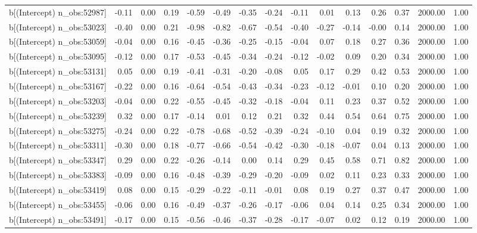 \begin{table}[ht]
\begin{tabular}{rrrrrrrrrrrrrrr}
  b[(Intercept) n\_obs:52987] & -0.11 & 0.00 & 0.19 & -0.59 & -0.49 & -0.35 & -0.24 & -0.11 & 0.01 & 0.13 & 0.26 & 0.37 & 2000.00 & 1.00 \\ 
  b[(Intercept) n\_obs:53023] & -0.40 & 0.00 & 0.21 & -0.98 & -0.82 & -0.67 & -0.54 & -0.40 & -0.27 & -0.14 & -0.00 & 0.14 & 2000.00 & 1.00 \\ 
  b[(Intercept) n\_obs:53059] & -0.04 & 0.00 & 0.16 & -0.45 & -0.36 & -0.25 & -0.15 & -0.04 & 0.07 & 0.18 & 0.27 & 0.36 & 2000.00 & 1.00 \\ 
  b[(Intercept) n\_obs:53095] & -0.12 & 0.00 & 0.17 & -0.53 & -0.45 & -0.34 & -0.24 & -0.12 & -0.02 & 0.09 & 0.20 & 0.34 & 2000.00 & 1.00 \\ 
  b[(Intercept) n\_obs:53131] & 0.05 & 0.00 & 0.19 & -0.41 & -0.31 & -0.20 & -0.08 & 0.05 & 0.17 & 0.29 & 0.42 & 0.53 & 2000.00 & 1.00 \\ 
  b[(Intercept) n\_obs:53167] & -0.22 & 0.00 & 0.16 & -0.64 & -0.54 & -0.43 & -0.34 & -0.23 & -0.12 & -0.01 & 0.10 & 0.20 & 2000.00 & 1.00 \\ 
  b[(Intercept) n\_obs:53203] & -0.04 & 0.00 & 0.22 & -0.55 & -0.45 & -0.32 & -0.18 & -0.04 & 0.11 & 0.23 & 0.37 & 0.52 & 2000.00 & 1.00 \\ 
  b[(Intercept) n\_obs:53239] & 0.32 & 0.00 & 0.17 & -0.14 & 0.01 & 0.12 & 0.21 & 0.32 & 0.44 & 0.54 & 0.64 & 0.75 & 2000.00 & 1.00 \\ 
  b[(Intercept) n\_obs:53275] & -0.24 & 0.00 & 0.22 & -0.78 & -0.68 & -0.52 & -0.39 & -0.24 & -0.10 & 0.04 & 0.19 & 0.32 & 2000.00 & 1.00 \\ 
  b[(Intercept) n\_obs:53311] & -0.30 & 0.00 & 0.18 & -0.77 & -0.66 & -0.54 & -0.42 & -0.30 & -0.18 & -0.07 & 0.04 & 0.13 & 2000.00 & 1.00 \\ 
  b[(Intercept) n\_obs:53347] & 0.29 & 0.00 & 0.22 & -0.26 & -0.14 & 0.00 & 0.14 & 0.29 & 0.45 & 0.58 & 0.71 & 0.82 & 2000.00 & 1.00 \\ 
  b[(Intercept) n\_obs:53383] & -0.09 & 0.00 & 0.16 & -0.48 & -0.39 & -0.29 & -0.20 & -0.09 & 0.02 & 0.11 & 0.23 & 0.33 & 2000.00 & 1.00 \\ 
  b[(Intercept) n\_obs:53419] & 0.08 & 0.00 & 0.15 & -0.29 & -0.22 & -0.11 & -0.01 & 0.08 & 0.19 & 0.27 & 0.37 & 0.47 & 2000.00 & 1.00 \\ 
  b[(Intercept) n\_obs:53455] & -0.06 & 0.00 & 0.16 & -0.49 & -0.37 & -0.26 & -0.17 & -0.06 & 0.04 & 0.14 & 0.25 & 0.34 & 2000.00 & 1.00 \\ 
  b[(Intercept) n\_obs:53491] & -0.17 & 0.00 & 0.15 & -0.56 & -0.46 & -0.37 & -0.28 & -0.17 & -0.07 & 0.02 & 0.12 & 0.19 & 2000.00 & 1.00 \\ 

\end{tabular}
\end{table}

